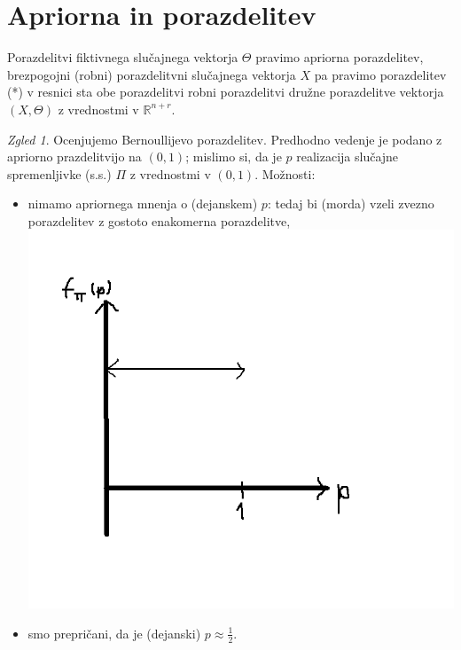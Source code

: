 \documentclass[a4paper, 12pt]{book}
\theoremstyle{definition}
\theoremstyle{remark}
\newtheorem*{exmp}{Zgled}
\newcommand{\R}{\mathbb{R}}
\begin{document}
\section{Apriorna in  porazdelitev}

Porazdelitvi fiktivnega slučajnega vektorja $\Theta$ pravimo apriorna porazdelitev,
brezpogojni (robni) porazdelitvni slučajnega vektorja $X$ pa pravimo  porazdelitev \\
(*) v resnici sta obe porazdelitvi robni porazdelitvi družne porazdelitve vektorja $(X, \Theta)$ z vrednostmi v $\R^{n+r}$.
\begin{exmp}
  Ocenjujemo Bernoullijevo porazdelitev. Predhodno vedenje je podano z apriorno prazdelitvijo na $(0,1)$;
  mislimo si, da je $p$ realizacija slučajne spremenljivke (s.s.) $\Pi$ z vrednostmi v $(0,1)$. Možnosti:
  \begin{itemize}
    \item nimamo apriornega mnenja o (dejanskem) $p$: tedaj bi (morda) vzeli zvezno porazdelitev z gostoto enakomerna porazdelitve, \\
      \includegraphics[scale=0.4]{apriori_nimamo_1_3} \\
    \item smo  prepričani, da je (dejanski) $p \approx \frac{1}{2}$. \\ %

\end{itemize}
\end{exmp}
\end{document}
